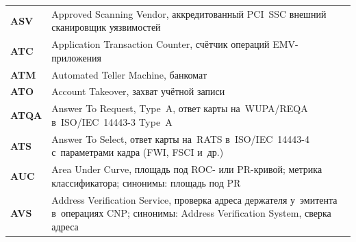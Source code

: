 \begin{longtable}{@{}p{4.5em}p{\dimexpr\linewidth-4.5em-2\tabcolsep\relax}@{}}
  \textbf{ASV}               & Approved Scanning Vendor, аккредитованный PCI~SSC внешний сканировщик уязвимостей                                                                                                                                                                                                                \\
  \textbf{ATC}               & Application Transaction Counter, счётчик операций EMV-приложения                                                                                                                                                                                                                                 \\
  \textbf{ATM}               & Automated Teller Machine, банкомат                                                                                                                                                                                                                                                               \\
  \textbf{ATO}               & Account Takeover, захват учётной записи                                                                                                                                                                                                                                                          \\
  \textbf{ATQA}              & Answer To Request, Type~A, ответ карты на~WUPA/REQA в~ISO/IEC~14443-3 Type~A                                                                                                                                                                                                                    \\
  \textbf{ATS}               & Answer To Select, ответ карты на~RATS в~ISO/IEC~14443-4 с~параметрами кадра (FWI, FSCI и~др.)                                                                                                                                                                                                   \\
  \textbf{AUC}               & Area Under Curve, площадь под ROC- или PR-кривой; метрика классификатора; синонимы: площадь под PR                                                                                                                                                                                               \\
  \textbf{AVS}               & Address Verification Service, проверка адреса держателя у~эмитента в~операциях CNP; синонимы: Address Verification System, сверка адреса                                                                                                                                                         \\

\end{longtable}
